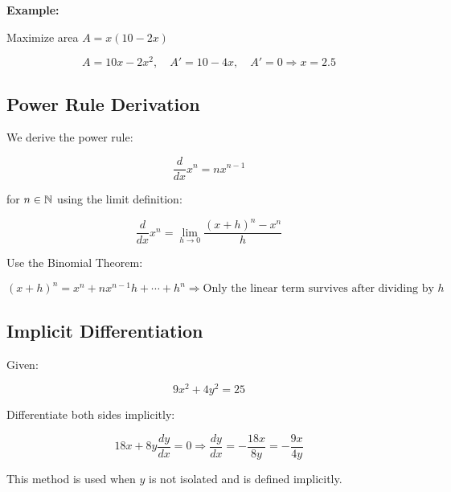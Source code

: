 \textbf{Example:}
\vspace{\baselineskip}

Maximize area \(A = x(10 - 2x)\)

\[
    A = 10x - 2x^2, \quad A' = 10 - 4x, \quad A' = 0 \Rightarrow x = 2.5
\]

\subsection{Power Rule Derivation}

We derive the power rule:


\[
    \frac{d}{dx} x^n = nx^{n - 1}
\]

for \(n \in \mathbb{N}\) using the limit definition:

\[
    \frac{d}{dx} x^n = \lim_{h \to 0} \frac{{(x + h)}^n - x^n}{h}
\]

Use the Binomial Theorem:

\[
    {(x + h)}^n = x^n + nx^{n-1}h + \cdots + h^n
    \Rightarrow \text{Only the linear term survives after dividing by } h
\]

\subsection{Implicit Differentiation}

Given:

\[
    9x^2 + 4y^2 = 25
\]

Differentiate both sides implicitly:

\[
    18x + 8y \frac{dy}{dx} = 0
    \Rightarrow \frac{dy}{dx} = -\frac{18x}{8y} = -\frac{9x}{4y}
\]

This method is used when \(y\) is not isolated and is defined implicitly.
